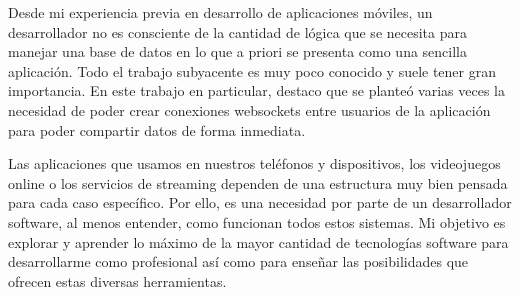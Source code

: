 Desde mi experiencia previa en desarrollo de aplicaciones móviles, un desarrollador no es consciente de la cantidad de lógica que se necesita para manejar una base
de datos en lo que a priori se presenta como una sencilla aplicación. Todo el trabajo subyacente es muy poco conocido y suele tener gran importancia. En este trabajo en particular,
destaco que se planteó varias veces la necesidad de poder crear conexiones websockets entre usuarios de la aplicación para poder compartir datos de forma inmediata.

Las aplicaciones que usamos en nuestros teléfonos y dispositivos, los videojuegos online o los servicios de streaming 
dependen de una estructura muy bien pensada para cada caso específico. Por ello, es una necesidad por parte de un desarrollador software, 
al menos entender, como funcionan todos estos sistemas. Mi objetivo es explorar y aprender lo máximo de la mayor cantidad de tecnologías 
software para desarrollarme como profesional así como para enseñar las posibilidades que ofrecen estas diversas herramientas.
